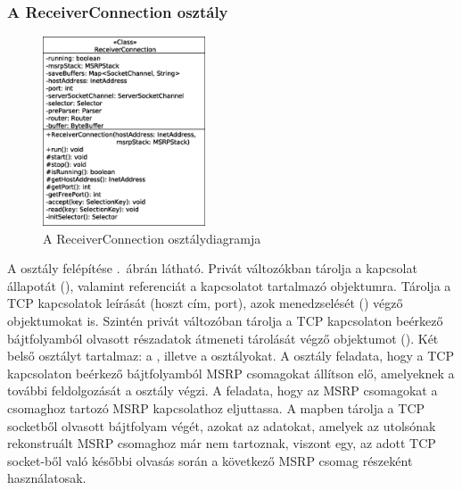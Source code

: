 \subsubsection*{A ReceiverConnection osztály}
\label{sec:msrp_receiverconnection}

\begin{figure}
  \vspace{-40pt}
  \begin{center}
    \includegraphics[width=0.43\textwidth]{img/class_diagrams/ReceiverConnection.eps}
  \end{center}
  \vspace{-15pt}
  \captionsetup{font=scriptsize}
  \caption{A ReceiverConnection osztálydiagramja}
   \label{fig:class_receiverconnection}
  \vspace{-10pt}
\end{figure}
A osztály felépítése .~ábrán látható. Privát változókban tárolja a kapcsolat állapotát (), valamint referenciát a kapcsolatot tartalmazó  objektumra. Tárolja a TCP kapcsolatok leírását (hoszt cím, port), azok menedzselését () végző objektumokat is. Szintén privát változóban tárolja a TCP kapcsolaton beérkező bájtfolyamból olvasott részadatok átmeneti tárolását végző objektumot (). Két belső osztályt tartalmaz: a , illetve a  osztályokat. A  osztály feladata, hogy a TCP kapcsolaton beérkező bájtfolyamból MSRP csomagokat állítson elő, amelyeknek a további feldolgozását a  osztály végzi. A  feladata, hogy az MSRP csomagokat a csomaghoz tartozó MSRP kapcsolathoz eljuttassa. A  mapben tárolja a TCP socketből olvasott bájtfolyam végét, azokat az adatokat, amelyek az utolsónak rekonstruált MSRP csomaghoz már nem tartoznak, viszont egy, az adott TCP socket-ből való későbbi olvasás során a következő MSRP csomag részeként használatosak.


